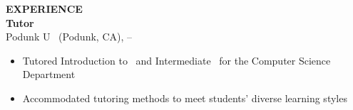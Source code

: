 \textbf{\headingcolor EXPERIENCE}\\
\textbf{Tutor}\\ 
Podunk U \ (Podunk, CA),   -- \\
\begin{itemize}
\setlength\itemsep{0pt}
\item Tutored Introduction to \J \ and Intermediate \J \ for the Computer Science Department\\
\item Accommodated tutoring methods to meet students\textquoteright{} diverse learning styles\\
\end{itemize}
